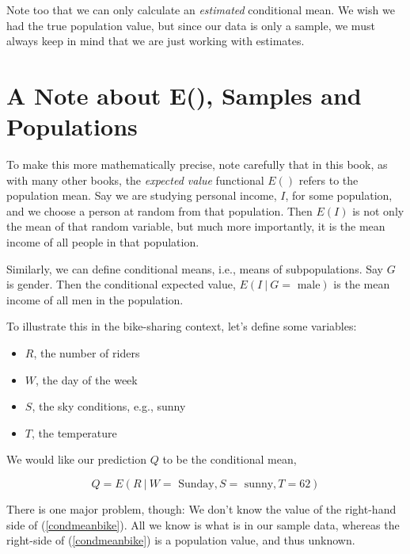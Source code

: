 Note too that we can only calculate an {\it estimated} conditional mean.
We wish we had the true population value, but since our data is only a
sample, we must always keep in mind that we are just working with
estimates.

\section{A Note about E(), Samples and Populations}
\label{eof}

To make this more mathematically precise, note carefully that in this
book, as with many other books, the {\it expected value} functional
$E()$ refers to the population mean.  Say we are studying personal
income, $I$, for some population, and we choose a person at random from
that population.  Then $E(I)$ is not only the mean of that random
variable, but much more importantly, it is the mean income of all people
in that population.  

Similarly, we can define conditional means, i.e., means of subpopulations.
Say $G$ is gender.  Then the conditional expected value, $E(I ~|~ G =
\textrm{ male})$ is the mean income of all men in the population.

To illustrate this in the bike-sharing context, let's define some
variables:

\begin{itemize}

\item $R$, the number of riders

\item $W$, the day of the week

\item $S$, the sky conditions, e.g., sunny

\item $T$, the temperature

\end{itemize}

We would like our prediction $Q$ to be the conditional mean,

\begin{equation}
\label{condmeanbike}
Q = E(R ~|~ W = \textrm{ Sunday}, S = \textrm{ sunny}, T = 62)
\end{equation}

There is one major problem, though:  We don't know the value of the
right-hand side of (\ref{condmeanbike}).  All we know is what is in our
sample data, whereas the right-side of (\ref{condmeanbike}) is a
population value, and thus unknown.  

